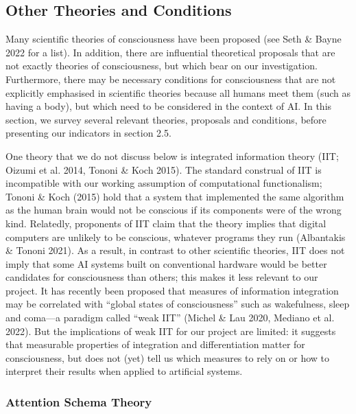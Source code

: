 \documentclass[12pt]{article}
\begin{document}
\subsection{Other Theories and Conditions}
Many scientific theories of consciousness have been proposed (see Seth \& Bayne 2022 for a list). In addition, there are influential theoretical proposals that are not exactly theories of consciousness, but which bear on our investigation. Furthermore, there may be necessary conditions for consciousness that are not explicitly emphasised in scientific theories because all humans meet them (such as having a body), but which need to be considered in the context of AI. In this section, we survey several relevant theories, proposals and conditions, before presenting our indicators in section 2.5.

One theory that we do not discuss below is integrated information theory (IIT; Oizumi et al. 2014, Tononi \& Koch 2015). The standard construal of IIT is incompatible with our working assumption of computational functionalism; Tononi \& Koch (2015) hold that a system that implemented the same algorithm as the human brain would not be conscious if its components were of the wrong kind. Relatedly, proponents of IIT claim that the theory implies that digital computers are unlikely to be conscious, whatever programs they run (Albantakis \& Tononi 2021). As a result, in contrast to other scientific theories, IIT does not imply that some AI systems built on conventional hardware would be better candidates for consciousness than others; this makes it less relevant to our project. It has recently been proposed that measures of information integration may be correlated with ``global states of consciousness'' such as wakefulness, sleep and coma—a paradigm called ``weak IIT'' (Michel \& Lau 2020, Mediano et al. 2022). But the implications of weak IIT for our project are limited: it suggests that measurable properties of integration and differentiation matter for consciousness, but does not (yet) tell us which measures to rely on or how to interpret their results when applied to artificial systems.

\subsubsection{Attention Schema Theory}
\end{document}

